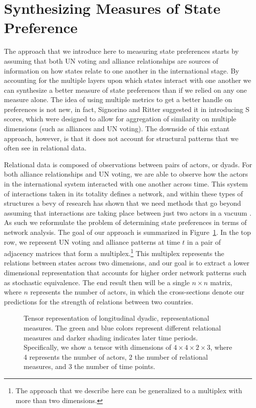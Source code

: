 \section*{Synthesizing Measures of State Preference}

The approach that we introduce here to measuring state preferences starts by assuming that both UN voting and alliance relationships are sources of information on how states relate to one another in the international stage. By accounting for the multiple layers upon which states interact with one another we can synthesize a better measure of state preferences than if we relied on any one measure alone. The idea of using multiple metrics to get a better handle on preferences is not new, in fact, Signorino and Ritter suggested it in introducing S scores, which were designed to allow for aggregation of similarity on multiple dimensions (such as alliances and UN voting). The downside of this extant approach, however, is that it does not account for structural patterns that we often see in relational data. 

Relational data is composed of observations between pairs of actors, or dyads. For both alliance relationships and UN voting, we are able to observe how the actors in the international system  interacted with one another across time. This system of interactions taken in its totality defines a network, and within these types of structures a bevy of research has shown that we need methods that go beyond assuming that interactions are taking place between just two actors in a vacuum \citep{wasserman:faust:1994,snijders:nowicki:1997}. As such we reformulate the problem of determining state preferences in terms of network analysis. The goal of our approach is summarized in Figure~\ref{fig:tensViz}. In the top row, we represent UN voting and alliance patterns at time $t$ in a pair of adjacency matrices that form a multiplex.\footnote{The approach that we describe here can be generalized to a multiplex with more than two dimensions.} This multiplex represents the relations between states across two dimensions, and our goal is to extract a lower dimensional representation that accounts for higher order network patterns such as stochastic equivalence. The end result then will be a single $n \times n$ matrix, where $n$ represents the number of actors, in which the cross-sections denote our predictions for the strength of relations between two countries.

\begin{figure}[ht]
	\centering
	\resizebox{.5\textwidth}{!}{}
	\caption{Tensor representation of longitudinal dyadic, representational measures. The green and blue colors represent different relational measures and darker shading indicates later time periods. Specifically, we show a tensor with dimensions of $4 \times 4 \times 2 \times 3$, where 4 represents the number of actors, 2 the number of relational measures, and 3 the number of time points.}
	\label{fig:tensViz}
\end{figure}

